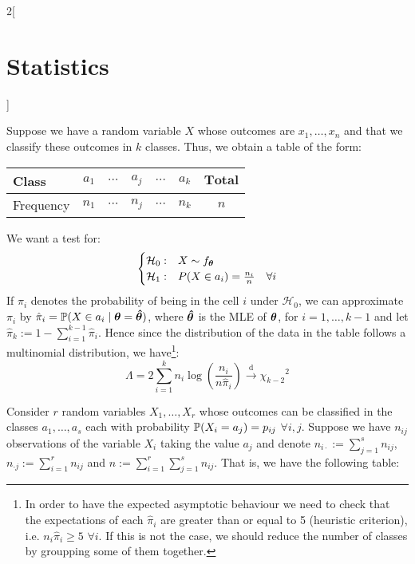 \documentclass[../../../main.tex]{subfiles}
\begin{document}
\begin{multicols}{2}[\section{Statistics}]
\begin{theorem}
  \end{theorem}
  \begin{definition}
    Suppose we have a random variable $X$ whose outcomes are $x_1,\ldots,x_n$ and that we classify these outcomes in $k$ classes. Thus, we obtain a table of the form:
    \begin{center}
      \begin{minipage}{\linewidth}
        \centering
        \begin{tabular}{l||ccccc|c}
          Class     & $a_1$   & $\cdots$ & $a_j$   & $\cdots$ & $a_k$   & $\mathbf{Total}$ \\
          \hline
          Frequency & $n_{1}$ & $\cdots$ & $n_{j}$ & $\cdots$ & $n_{k}$ & $n$              \\
        \end{tabular}
      \end{minipage}
    \end{center}
    We want a test for:
    $$
      \begin{cases}
        \mathcal{H}_0: & X\sim f_{\boldsymbol{\mathrm{\theta}}}                     \\
        \mathcal{H}_1: & P(X\in a_i)=\frac{n_i}{n}\quad\forall i
      \end{cases}
    $$
    If $\pi_i$ denotes the probability of being in the cell $i$ under $\mathcal{H}_0$, we can approximate $\pi_i$ by $\hat\pi_i=\mathbb{P}(X\in a_i\mid {\boldsymbol{\mathrm{\theta}}}={\boldsymbol{\mathrm{\hat\theta}}})$, where ${\boldsymbol{\mathrm{\hat\theta}}}$ is the MLE of ${\boldsymbol{\mathrm{\theta}}}$, for $i=1,\ldots,k-1$ and let $\hat\pi_k:=1-\sum_{i=1}^{k-1}\hat\pi_i$. Hence since the distribution of the data in the table follows a multinomial distribution, we have\footnote{In order to have the expected asymptotic behaviour we need to check that the expectations of each $\hat\pi_i$ are greater than or equal to 5 (heuristic criterion), i.e. $n_i\hat\pi_i\geq 5$ $\forall i$. If this is not the case, we should reduce the number of classes by groupping some of them together.}:
    $$\Lambda=2\sum_{i=1}^kn_i\log\left(\frac{n_i}{n\hat\pi_i}\right)\overset{\text{d}}{\longrightarrow}{\chi_{k-2}}^2$$
  \end{definition}
  \begin{definition}
    Consider $r$ \iid random variables $X_1,\ldots,X_r$ whose outcomes can be classified in the classes $a_1,\ldots,a_s$ each with probability $\mathbb{P}(X_i=a_j)=p_{ij}$ $\forall i,j$. Suppose we have $n_{ij}$ observations of the variable $X_i$ taking the value $a_j$ and denote $n_{i\cdot}:=\sum_{j=1}^sn_{ij}$, $n_{\cdot j}:=\sum_{i=1}^rn_{ij}$ and $n:=\sum_{i=1}^r\sum_{j=1}^sn_{ij}$. That is, we have the following table:

\end{definition}
\end{multicols}
\end{document}
